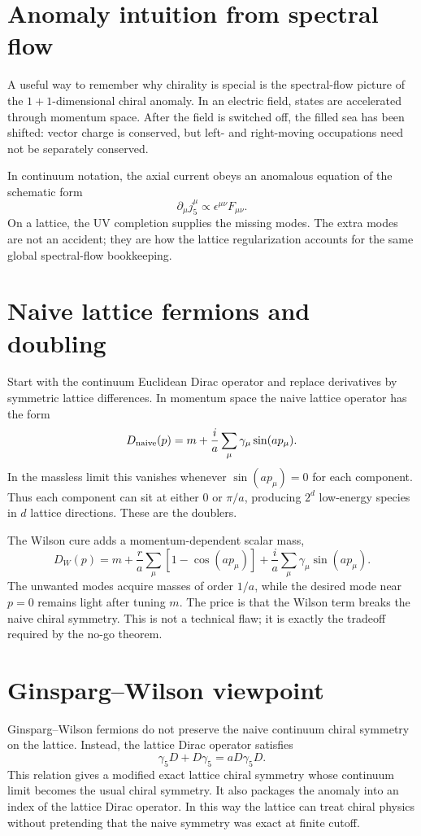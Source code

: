 \documentclass[11pt]{article}
\begin{document}
\section{Anomaly intuition from spectral flow}
A useful way to remember why chirality is special is the spectral-flow picture of the $1+1$-dimensional chiral anomaly. In an electric field, states are accelerated through momentum space. After the field is switched off, the filled sea has been shifted: vector charge is conserved, but left- and right-moving occupations need not be separately conserved.

In continuum notation, the axial current obeys an anomalous equation of the schematic form
\begin{equation}
  \partial_\mu j_5^\mu \propto \epsilon^{\mu\nu}F_{\mu\nu}.
\end{equation}
On a lattice, the UV completion supplies the missing modes. The extra modes are not an accident; they are how the lattice regularization accounts for the same global spectral-flow bookkeeping.

\section{Naive lattice fermions and doubling}
Start with the continuum Euclidean Dirac operator and replace derivatives by symmetric lattice differences. In momentum space the naive lattice operator has the form
\begin{equation}
  D_{\rm naive}(p)=m+\frac{i}{a}\sum_\mu \gamma_\mu \sin(a p_\mu).
\end{equation}
In the massless limit this vanishes whenever $\sin(a p_\mu)=0$ for each component. Thus each component can sit at either $0$ or $\pi/a$, producing $2^d$ low-energy species in $d$ lattice directions. These are the doublers.

The Wilson cure adds a momentum-dependent scalar mass,
\begin{equation}
  D_W(p)=m+\frac{r}{a}\sum_\mu \left[1-\cos(a p_\mu)\right]
  +\frac{i}{a}\sum_\mu \gamma_\mu \sin(a p_\mu).
\end{equation}
The unwanted modes acquire masses of order $1/a$, while the desired mode near $p=0$ remains light after tuning $m$. The price is that the Wilson term breaks the naive chiral symmetry. This is not a technical flaw; it is exactly the tradeoff required by the no-go theorem.

\section{Ginsparg--Wilson viewpoint}
Ginsparg--Wilson fermions do not preserve the naive continuum chiral symmetry on the lattice. Instead, the lattice Dirac operator satisfies
\begin{equation}
  \gamma_5 D + D\gamma_5 = aD\gamma_5D.
\end{equation}
This relation gives a modified exact lattice chiral symmetry whose continuum limit becomes the usual chiral symmetry. It also packages the anomaly into an index of the lattice Dirac operator. In this way the lattice can treat chiral physics without pretending that the naive symmetry was exact at finite cutoff.
\end{document}
